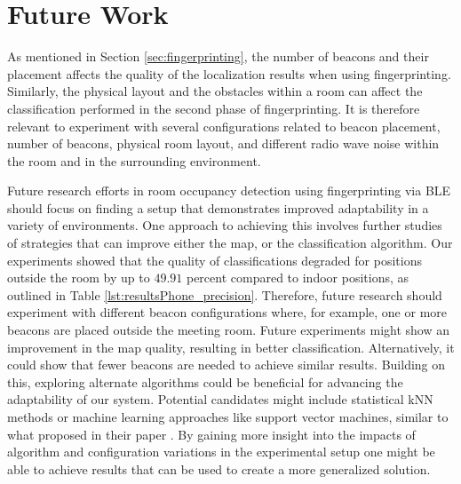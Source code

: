 \chapter{Future Work}
As mentioned in Section \ref{sec:fingerprinting}, the number of beacons and their placement affects the quality of the localization results when using fingerprinting. 
Similarly, the physical layout and the obstacles within a room can affect the classification performed in the second phase of fingerprinting. 
It is therefore relevant to experiment with several configurations related to beacon placement, number of beacons, physical room layout, and different radio wave noise within the room and in the surrounding environment. 

Future research efforts in room occupancy detection using fingerprinting via BLE should focus on finding a setup that demonstrates improved adaptability in a variety of environments.
One approach to achieving this involves further studies of strategies that can improve either the map, or the classification algorithm.
Our experiments showed that the quality of classifications degraded for positions outside the room by up to $49.91$ percent compared to indoor positions, as outlined in Table \ref{lst:resultsPhone_precision}.
Therefore, future research should experiment with different beacon configurations where, for example, one or more beacons are placed outside the meeting room. 
Future experiments might show an improvement in the map quality, resulting in better classification. Alternatively, it could show that fewer beacons are needed to achieve similar results.
Building on this, exploring alternate algorithms could be beneficial for advancing the adaptability of our system.
Potential candidates might include statistical kNN methods or machine learning approaches like support vector machines, similar to what \citeauthor{ble_kneares_neural} proposed in their paper \cite{ble_kneares_neural}. 
By gaining more insight into the impacts of algorithm and configuration variations in the experimental setup one might be able to achieve results that can be used to create a more generalized solution.

